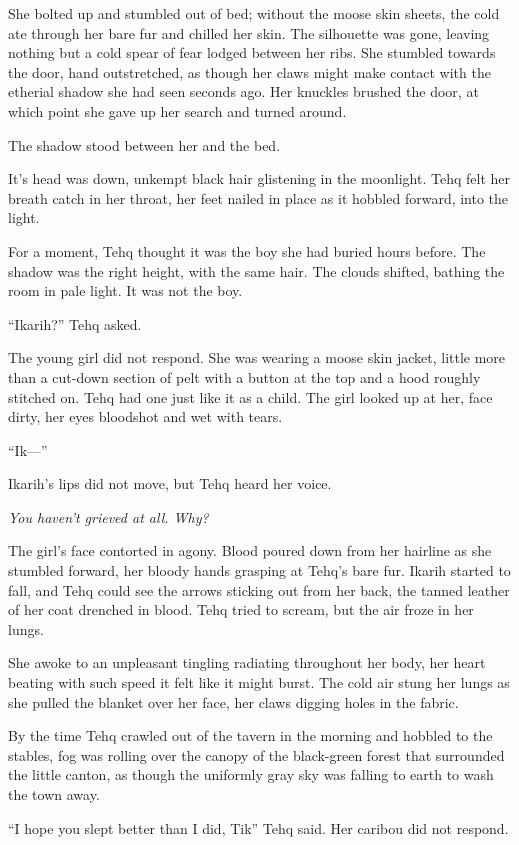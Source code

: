 She bolted up and stumbled out of bed; without the moose skin sheets, the cold ate through her bare fur and chilled her skin. The silhouette was gone, leaving nothing but a cold spear of fear lodged between her ribs. She stumbled towards the door, hand outstretched, as though her claws might make contact with the etherial shadow she had seen seconds ago. Her knuckles brushed the door, at which point she gave up her search and turned around.

The shadow stood between her and the bed.

It's head was down, unkempt black hair glistening in the moonlight. Tehq felt her breath catch in her throat, her feet nailed in place as it hobbled forward, into the light.

For a moment, Tehq thought it was the boy she had buried hours before. The shadow was the right height, with the same hair. The clouds shifted, bathing the room in pale light. It was not the boy.

``Ikarih?'' Tehq asked.

The young girl did not respond. She was wearing a moose skin jacket, little more than a cut-down section of pelt with a button at the top and a hood roughly stitched on. Tehq had one just like it as a child. The girl looked up at her, face dirty, her eyes bloodshot and wet with tears.

``Ik---''

Ikarih's lips did not move, but Tehq heard her voice.

\emph{You haven't grieved at all. Why?}

The girl's face contorted in agony. Blood poured down from her hairline as she stumbled forward, her bloody hands grasping at Tehq's bare fur. Ikarih started to fall, and Tehq could see the arrows sticking out from her back, the tanned leather of her coat drenched in blood. Tehq tried to scream, but the air froze in her lungs.

She awoke to an unpleasant tingling radiating throughout her body, her heart beating with such speed it felt like it might burst. The cold air stung her lungs as she pulled the blanket over her face, her claws digging holes in the fabric.

By the time Tehq crawled out of the tavern in the morning and hobbled to the stables, fog was rolling over the canopy of the black-green forest that surrounded the little canton, as though the uniformly gray sky was falling to earth to wash the town away.

``I hope you slept better than I did, Tik'' Tehq said. Her caribou did not respond.

